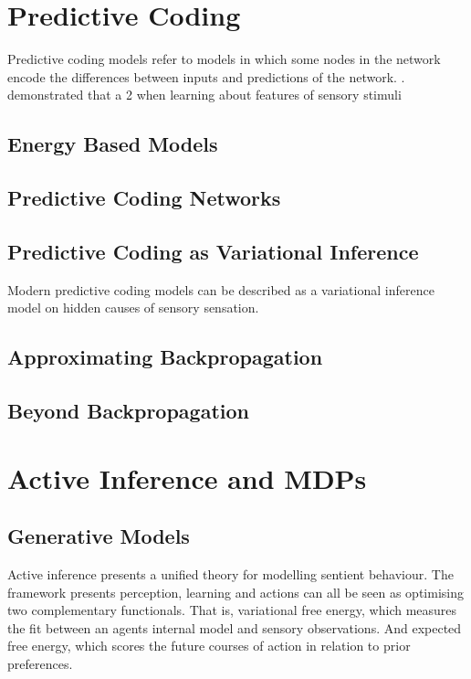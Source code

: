 \documentclass{article}
\begin{document}
\section{Predictive Coding}

Predictive coding models refer to models in which some nodes in the network encode the differences between inputs and predictions of the network. \citep{bogacz2017tutorial}. \citet{rao1999predictive} demonstrated that a 2  when learning about features of sensory stimuli 

\subsection{Energy Based Models}

\subsection{Predictive Coding Networks}

\subsection{Predictive Coding as Variational Inference}

Modern predictive coding models can be described as a variational inference model on hidden causes of sensory sensation. \citep{millidge2021applications}

\subsection{Approximating Backpropagation}

\subsection{Beyond Backpropagation}

\section{Active Inference and MDPs}

\subsection{Generative Models}

Active inference presents a unified theory for modelling sentient behaviour. The framework presents perception, learning and actions can all be seen as optimising two complementary functionals. \citep{dacosta2020active} That is, variational free energy, which measures the fit between an agents internal model and sensory observations. And expected free energy, which scores the future courses of action in relation to prior preferences. \citep{dacosta2020active}
\end{document}

